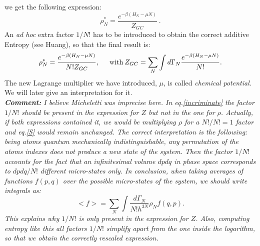 we get the following expression:
\begin{equation}
\label{eq:rho_micro}
    \rho_N^*=\frac{e^{-\beta(H_N-\mu N)}}{Z_{GC}}\:. 
\end{equation}
An \textit{ad hoc} extra factor $1/N!$ has to be introduced to obtain the correct additive Entropy (see Huang), so that the final result is:
\begin{equation}\label{incriminate} 
    \rho_N^*=\frac{e^{-\beta(H_N-\mu N)}}{N! Z_{GC}},\hspace{0.5 cm} \text{with} \: Z_{GC}= \sum_N\int d\Gamma_N \frac{e^{-\beta(H_N-\mu N)}}{N!}.
\end{equation}
The new Lagrange multiplier we have introduced, $\mu$, is called \textit{chemical potential}. We will later give an interpretation for it.\\

\textit{\textbf{Comment:} I believe Micheletti was imprecise here. In eq.\ref{incriminate} the factor $1/N!$ should be present in the expression for $Z$ but not in the one for $\rho$. Actually, if both expressions contained it, we would be multiplying $\rho$ for a $N!/N!=1$ factor and eq.\ref{S} would remain unchanged. The correct interpretation is the following: being atoms quantum mechanically indistinguishable, any permutation of the atoms indexes does not produce a new state of the system. Then the factor $1/N!$ accounts for the fact that an infinitesimal volume $dpdq$ in phase space corresponds to $dpdq/N!$ different micro-states only. In conclusion, when taking averages of functions $f(p,q)$ over the possible micro-states of the system, we should write integrals as:
\begin{equation}
    <f> = \sum_N \int \frac{d\Gamma_N}{N!h^{3N}}  \rho_N f(q,p).
\end{equation}
This explains why $1/N!$ is only present in the expression for $Z$. Also, computing entropy like this all factors $1/N!$ simplify apart from the one inside the logarithm, so that we obtain the correctly rescaled expression.
}\\


